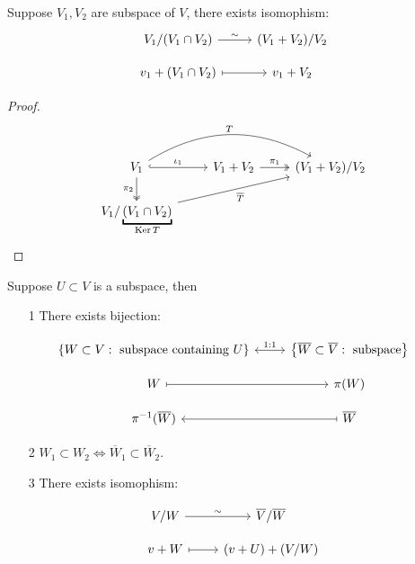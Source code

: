 \begin{theorem}
    Suppose $V_1, V_2$ are subspace of $V$, there exists isomophism:
    \[
        \begin{tikzcd}[row sep=small]
            V_1 / (V_1 \cap V_2) \arrow[r, "\sim"]
            & (V_1 + V_2) / V_2 \\
            v_1 + (V_1 \cap V_2) \arrow[mapsto, r]
            & v_1 + V_2
        \end{tikzcd}
    \]
\end{theorem}

\begin{proof}
    $$
        \begin{tikzcd}
            V_1 \arrow[hook, r, "\iota_1"] \arrow[rr, bend left, "T"]  \arrow[d, two heads, "\pi_2"']
            & V_1 + V_2 \arrow[two heads, r, "\pi_1"]
            & (V_1 + V_2) / V_2
            \\
            V_1 / \underbracket{(V_1 \cap V_2)}_{\Ker T} \arrow[rru, "\overline{T}"']
            &
            &
        \end{tikzcd}
    $$
\end{proof}





\begin{theorem}
    Suppose $U \subset V$ is a subspace, then
    \begin{enumerate}
        \item[1] There exists bijection:
    \end{enumerate}
    \[
        \begin{tikzcd}[row sep=small]
            \left\{ W \subset V: \text{ subspace containing } U \right\} \arrow[leftrightarrow, r, "1:1"]
            & \left\{ \overline{W} \subset \overline{V}: \text{ subspace} \right\}
            \\
            W \arrow[mapsto, r]
            & \pi(W)
            \\
            \pi^{-1}(\overline{W})
            & \overline{W}  \arrow[mapsto, l]
        \end{tikzcd}
    \]
    \begin{enumerate}
        \item[2] $W_1 \subset W_2 \Leftrightarrow \overline{W}_1 \subset \overline{W}_2$.
        \item[3] There exists isomophism:
    \end{enumerate}
    \[
        \begin{tikzcd}[row sep=small]
            V / W \arrow[r, "\sim"]
            & \overline{V} / \overline{W}
            \\
            v + W \arrow[mapsto, r]
            & (v + U) + (V / W)
        \end{tikzcd}
    \]
\end{theorem}

